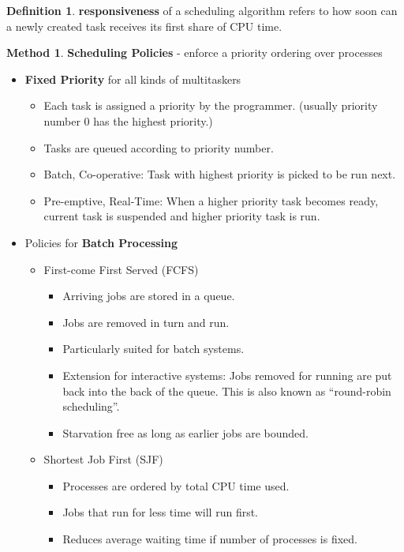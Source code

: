 \documentclass[12pt,a4paper]{article}
\theoremstyle{definition}
\newtheorem{definition}{Definition}[section]
\newtheorem{method}{Method}[section]
\newenvironment{myitemize}
{ \begin{itemize}
    \setlength{\itemsep}{5pt}
    \setlength{\parskip}{0pt}
    \setlength{\parsep}{0pt}     }
{ \end{itemize}                  }
\begin{document}
\begin{definition}{\textbf{responsiveness}}
	of a scheduling algorithm refers to how soon can a newly created task receives its first share of CPU time.
\end{definition}

\begin{method}{\textbf{Scheduling Policies} - enforce a priority ordering over processes}
	\begin{myitemize}
		\item \textbf{Fixed Priority} for all kinds of multitaskers
		\begin{myitemize}
			\item Each task is assigned a priority by the programmer. (usually priority number 0 has the highest priority.)
			\item Tasks are queued according to priority number.
			\item Batch, Co-operative: Task with highest priority is picked to be run next.
			\item Pre-emptive, Real-Time: When a higher priority task becomes ready, current task is suspended and higher priority task is run.
		\end{myitemize}
		\item Policies for \textbf{Batch Processing}
		\begin{myitemize}
			\item First-come First Served (\textsf{FCFS})
			\begin{myitemize}
				\item Arriving jobs are stored in a queue.
				\item Jobs are removed in turn and run.
				\item Particularly suited for batch systems.
				\item Extension for interactive systems: Jobs removed for running are put back into the back of the queue. This is also known as “round-robin scheduling”.
				\item Starvation free as long as earlier jobs are bounded.
			\end{myitemize}
			\item Shortest Job First (\textsf{SJF})
			\begin{myitemize}
				\item Processes are ordered by total CPU time used.
				\item Jobs that run for less time will run first.
				\item Reduces average waiting time if number of processes is fixed.

\end{myitemize}
\end{myitemize}
\end{myitemize}
\end{method}
\end{document}
